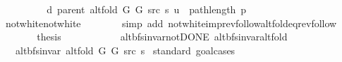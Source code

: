\begin{isabellebody}
\ \ \ \ \isamarkupfalse%
\ \isamarkupfalse%
\ {\isachardoublequoteopen}{\isachardot}{\kern0pt}{\isachardot}{\kern0pt}{\isachardot}{\kern0pt}\ {\isacharequal}{\kern0pt}\ d\ {\isacharparenleft}{\kern0pt}parent\ {\isacharparenleft}{\kern0pt}alt{\isacharunderscore}{\kern0pt}fold\ G{}\ G{}\ src\ s{\isacharparenright}{\kern0pt}{\isacharparenright}{\kern0pt}\ u\ {\isacharplus}{\kern0pt}\ path{\isacharunderscore}{\kern0pt}length\ p{\isachardoublequoteclose}\isanewline
\ \ \ \ \ \ \isamarkupfalse%
\ not{\isacharunderscore}{\kern0pt}white{\isacharunderscore}{\kern0pt}not{\isacharunderscore}{\kern0pt}white\isanewline
\ \ \ \ \ \ \isamarkupfalse%
\ {\isacharparenleft}{\kern0pt}simp\ add{\isacharcolon}{\kern0pt}\ not{\isacharunderscore}{\kern0pt}white{\isacharunderscore}{\kern0pt}imp{\isacharunderscore}{\kern0pt}rev{\isacharunderscore}{\kern0pt}follow{\isacharunderscore}{\kern0pt}alt{\isacharunderscore}{\kern0pt}fold{\isacharunderscore}{\kern0pt}eq{\isacharunderscore}{\kern0pt}rev{\isacharunderscore}{\kern0pt}follow{\isacharparenright}{\kern0pt}\isanewline
\ \ \ \ \isamarkupfalse%
\ \isamarkupfalse%
\ {\isacharquery}{\kern0pt}thesis\isanewline
\ \ \ \ \ \ \isacommand{{\isachardot}{\kern0pt}}\isamarkupfalse%
\isanewline
\ \ \isamarkupfalse%
\isanewline
{}\isamarkupfalse%
%
\endisatagproof
{\isafoldproof}%
%
\isadelimproof
\isanewline
%
\endisadelimproof
\isanewline
{}\isamarkupfalse%
\ {\isacharparenleft}{\kern0pt}\ alt{\isacharunderscore}{\kern0pt}bfs{\isacharunderscore}{\kern0pt}invar{\isacharunderscore}{\kern0pt}not{\isacharunderscore}{\kern0pt}DONE{\isacharparenright}{\kern0pt}\ alt{\isacharunderscore}{\kern0pt}bfs{\isacharunderscore}{\kern0pt}invar{\isacharunderscore}{\kern0pt}alt{\isacharunderscore}{\kern0pt}fold{\isacharcolon}{\kern0pt}\isanewline
\ \ \ {\isachardoublequoteopen}alt{\isacharunderscore}{\kern0pt}bfs{\isacharunderscore}{\kern0pt}invar{\isacharprime}{\kern0pt}{\isacharprime}{\kern0pt}\ {\isacharparenleft}{\kern0pt}alt{\isacharunderscore}{\kern0pt}fold\ G{}\ G{}\ src\ s{\isacharparenright}{\kern0pt}{\isachardoublequoteclose}\isanewline
%
\isadelimproof
%
\endisadelimproof
%
\isatagproof
{}\isamarkupfalse%
\ {\isacharparenleft}{\kern0pt}standard{\isacharcomma}{\kern0pt}\ goal{\isacharunderscore}{\kern0pt}cases{\isacharparenright}{\kern0pt}\isanewline
\ \ \isamarkupfalse%
\ {}\isanewline

\end{isabellebody}
